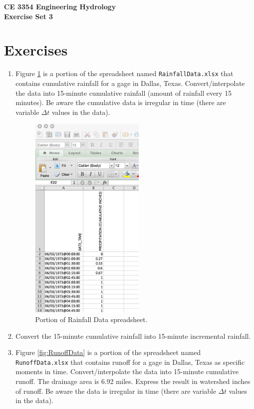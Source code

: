 \documentclass[12pt]{article}
\begin{document}
\begin{center}
{\textbf{{ CE 3354 Engineering Hydrology} \\ {Exercise Set 3}}}
\end{center}

\section*{\small{Exercises}}
\begin{enumerate}
\item  Figure \ref{fig:RainfallData} is a portion of the spreadsheet named \texttt{RainfallData.xlsx} that contains cumulative rainfall for a gage in Dallas, Texas.   Convert/interpolate the data into 15-minute cumulative rainfall (amount of rainfall every 15 minutes).   Be aware the cumulative data is irregular in time (there are variable $\Delta t$ values in the data). \\

\begin{figure}[h!] %
   \centering
   \includegraphics[height=4in]{RainfallData.jpg} 
   \caption{Portion of Rainfall Data spreadsheet.}
   \label{fig:RainfallData}
\end{figure}

\item Convert the 15-minute cumulative rainfall into 15-minute incremental rainfall. \\
\clearpage
\item  Figure \ref{fig:RunoffData} is a portion of the spreadsheet named \texttt{RunoffData.xlsx} that contains runoff for a gage in Dallas, Texas as specific moments in time.   Convert/interpolate the data into 15-minute cumulative runoff.   The drainage area is 6.92 miles.  Express the result in watershed inches of runoff.  Be aware the data is irregular in time (there are variable $\Delta t$ values in the data). \\


\end{enumerate}
\end{document}
